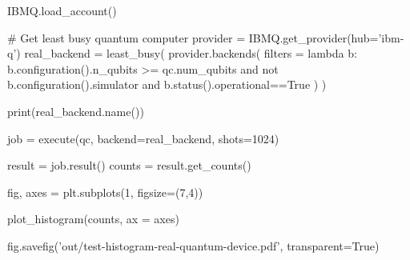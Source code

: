 \begin{python}
IBMQ.load_account()

# Get least busy quantum computer
provider = IBMQ.get_provider(hub='ibm-q')
real_backend = least_busy(
    provider.backends(
        filters = lambda b: b.configuration().n_qubits >= qc.num_qubits
            and not b.configuration().simulator and b.status().operational==True
    )
)

print(real_backend.name())

job = execute(qc, backend=real_backend, shots=1024)

result = job.result()
counts = result.get_counts()

fig, axes = plt.subplots(1, figsize=(7,4))

plot_histogram(counts, ax = axes)

fig.savefig('out/test-histogram-real-quantum-device.pdf', transparent=True)
\end{python}
